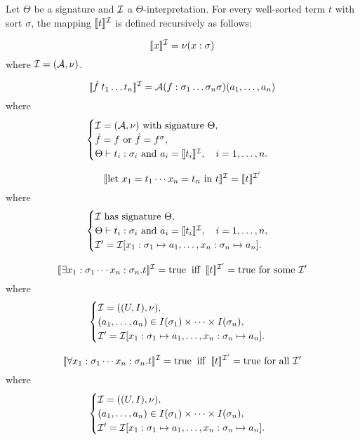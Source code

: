 \begin{definition}\label{def:smt-interpretation}
Let $\Theta$ be a signature and $\cal{I}$ a $\Theta$-interpretation.  
For every well-sorted term $t$ with sort $\sigma$, the mapping $\llbracket t \rrbracket^{\cal{I}}$ is defined recursively as follows:

\[
\llbracket x \rrbracket^{\cal{I}} = \nu(x : \sigma)
\]
where $\cal{I} = (\cal{A}, \nu)$.

\[
\llbracket \hat{f}\; t_1 \dots t_n \rrbracket^{\cal{I}}
   = \cal{A}(f : \sigma_1 \dots \sigma_n \sigma)(a_1, \dots, a_n)
\]
where
\[
\begin{cases}
   \cal{I} = (\cal{A}, \nu) \text{ with signature } \Theta, \\
   \hat{f} = f \text{ or } \hat{f} = f^{\sigma}, \\
   \Theta \vdash t_i : \sigma_i \text{ and } a_i = \llbracket t_i \rrbracket^{\cal{I}}, \quad i=1,\dots,n.
\end{cases}
\]

\[
\llbracket \text{let } x_1 = t_1 \cdots x_n = t_n \text{ in } t \rrbracket^{\cal{I}}
    = \llbracket t \rrbracket^{\cal{I}'}
\]
where
\[
\begin{cases}
   \cal{I} \text{ has signature } \Theta, \\
   \Theta \vdash t_i : \sigma_i \text{ and } a_i = \llbracket t_i \rrbracket^{\cal{I}}, \quad i=1,\dots,n, \\
   \cal{I}' = \cal{I}[x_1 : \sigma_1 \mapsto a_1, \dots, x_n : \sigma_n \mapsto a_n].
\end{cases}
\]

\[
\llbracket \exists x_1 : \sigma_1 \cdots x_n : \sigma_n . t \rrbracket^{\cal{I}} = \text{true}
\;\;\text{iff}\;\; \llbracket t \rrbracket^{\cal{I}'} = \text{true for some }\cal{I}' 
\]
where
\[
\begin{cases}
   \cal{I} = ((U,I),\nu), \\
   (a_1,\dots,a_n) \in I(\sigma_1) \times \cdots \times I(\sigma_n), \\
   \cal{I}' = \cal{I}[x_1 : \sigma_1 \mapsto a_1, \dots, x_n : \sigma_n \mapsto a_n].
\end{cases}
\]

\[
\llbracket \forall x_1 : \sigma_1 \cdots x_n : \sigma_n . t \rrbracket^{\cal{I}} = \text{true}
\;\;\text{iff}\;\; \llbracket t \rrbracket^{\cal{I}'} = \text{true for all }\cal{I}'
\]
where
\[
\begin{cases}
   \cal{I} = ((U,I),\nu), \\
   (a_1,\dots,a_n) \in I(\sigma_1) \times \cdots \times I(\sigma_n), \\
   \cal{I}' = \cal{I}[x_1 : \sigma_1 \mapsto a_1, \dots, x_n : \sigma_n \mapsto a_n].
\end{cases}
\]
\end{definition}

